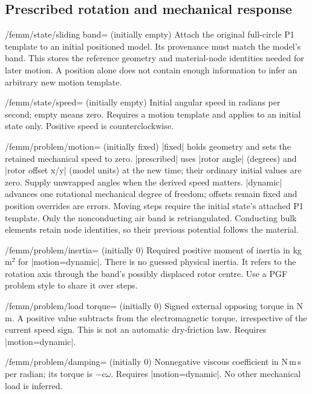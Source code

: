 \subsection{Prescribed rotation and mechanical response}
\label{sec:time-motion}
\begin{key}{/femm/state/sliding band= (initially empty)}
Attach the original full-circle P1 template to an initial positioned model.
Its provenance must match the model's band. This stores the reference geometry
and material-node identities needed for later motion. A position alone does not
contain enough information to infer an arbitrary new motion template.
\end{key}
\begin{key}{/femm/state/speed= (initially empty)}
Initial angular speed in radians per second; empty means zero. Requires a motion
template and applies to an initial state only. Positive speed is counterclockwise.
\end{key}
\begin{key}{/femm/problem/motion= (initially fixed)}
|fixed| holds geometry and sets the retained mechanical speed to zero.
|prescribed| uses |rotor angle| (degrees) and |rotor offset x/y| (model units) at
the new time; their ordinary initial values are zero. Supply unwrapped angles
when the derived speed matters. |dynamic| advances one rotational mechanical
degree of freedom; offsets remain fixed and position overrides are errors.
Moving steps require the initial state's attached P1 template. Only the
nonconducting air band is retriangulated. Conducting bulk elements retain node
identities, so their previous potential follows the material.
\end{key}
\begin{key}{/femm/problem/inertia= (initially 0)}
Required positive moment of inertia in kg\,m$^2$ for |motion=dynamic|. There is no
guessed physical inertia. It refers to the rotation axis through the band's
possibly displaced rotor centre. Use a PGF problem style to share it over steps.
\end{key}
\begin{key}{/femm/problem/load torque= (initially 0)}
Signed external opposing torque in N\,m. A positive value subtracts from the
electromagnetic torque, irrespective of the current speed sign. This is not an
automatic dry-friction law. Requires |motion=dynamic|.
\end{key}
\begin{key}{/femm/problem/damping= (initially 0)}
Nonnegative viscous coefficient in N\,m\,s per radian; its torque is $-c\omega$.
Requires |motion=dynamic|. No other mechanical load is inferred.
\end{key}

